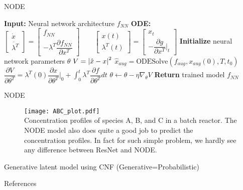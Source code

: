 \documentclass[dvipsnames, 9pt]{beamer}
\begin{document}
\begin{frame}{NODE}
    \begin{algorithmic}[1]
        \State \textbf{Input:} Neural network architecture $f_{NN}$
        \State \textbf{ODE:} 
        $
            \begin{bmatrix} \dot{x} \\ \dot{\lambda^T} \end{bmatrix} = 
            \begin{bmatrix} f_{NN} \\ -\lambda^T \dfrac{\partial f_{NN}}{\partial x^T}\end{bmatrix}
            \qquad
            \begin{bmatrix} x(t) \\ \lambda^T(t) \end{bmatrix} =
            \begin{bmatrix} x_t \\ - \dfrac{\partial g}{\partial x^T}|_{t} \end{bmatrix}
            \label{eq:augsens}
        $
        \State \textbf{Initialize} neural network parameters $\theta$
        \Repeat
            \State $V = \left| \hat{x} - x \right|^2$
            \State $\hat{x}_{aug} = \text{ODESolve}(f_{aug}, x_{aug}(0), T, t_0)$
            \State $\dfrac{\partial V}{\partial \theta^T} = \lambda^T(0)\dfrac{\partial x}{\partial \theta^T}|_0 + \int_0^t   \lambda^T \dfrac{\partial f}{\partial \theta^T} dt$
            \State $\theta \leftarrow \theta - \eta \nabla_{\theta} V$
        \State \textbf{Return} trained model $f_{NN}$
        \end{algorithmic}        
\end{frame}

\begin{frame}{NODE}
    \begin{figure}
        \centering
        \texttt{[image: ABC\_plot.pdf]}\\
        Concentration profiles of species A, B, and C in a batch reactor. The
    NODE model also does quite a good job to predict the concentration profiles. 
    In fact for such simple problem, we hardly see any difference between ResNet and NODE.
    \end{figure}
\end{frame}

\begin{frame}{Generative latent model using CNF (Generative=Probabilistic)}
\end{frame}

\begin{frame}[allowframebreaks]{References}
	\renewcommand{\refname}{}
	
	
\end{frame}
\end{document}
